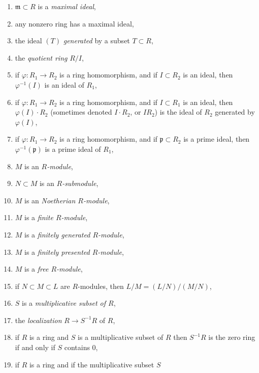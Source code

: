 \begin{enumerate}
\label{prime-ideal}
\item $\mathfrak m \subset R$ is a {\it maximal ideal},
\label{maximal-ideal}
\item any nonzero ring has a maximal ideal,
\label{exists-maximal-ideal}
\item the ideal $(T)$ {\it generated} by a subset $T \subset R$,
\label{ideal-generated-by}
\item the {\it quotient ring} $R/I$,
\label{quotient-ring}
\item if $\varphi : R_1 \to R_2$ is a ring homomorphism, and if
$I \subset R_2$ is an ideal, then $\varphi^{-1}(I)$ is an
ideal of $R_1$,
\label{inverse-image-ideal}
\item if $\varphi : R_1 \to R_2$ is a ring homomorphism, and if
$I \subset R_1$ is an ideal, then $\varphi(I) \cdot R_2$ (sometimes
denoted $I \cdot R_2$, or $IR_2$) is the ideal of $R_2$ generated
by $\varphi(I)$,
\label{image-ideal}
\item if $\varphi : R_1 \to R_2$ is a ring homomorphism, and if
$\mathfrak p \subset R_2$ is a prime ideal, then
$\varphi^{-1}(\mathfrak p)$ is a prime ideal of $R_1$,
\label{inverse-image-prime}
\item $M$ is an {\it $R$-module},
\label{module}
\item $N \subset M$ is an {\it $R$-submodule},
\label{submodule}
\item $M$ is an {\it Noetherian $R$-module},
\label{Noetherian-module}
\item $M$ is a {\it finite $R$-module},
\label{finite-module}
\item $M$ is a {\it finitely generated $R$-module},
\label{finitely-generated-module}
\item $M$ is a {\it finitely presented $R$-module},
\label{finitely-presented-module}
\item $M$ is a {\it free $R$-module},
\label{free-module}
\item if $N \subset M \subset L$ are $R$-modules,
then $L/M = (L/N)/(M/N)$,
\label{isomorphism-theorem}
\item $S$ is a {\it multiplicative subset of $R$},
\label{multiplicative-subset}
\item the {\it localization} $R \to S^{-1}R$ of $R$,
\label{localization-ring}
\item if $R$ is a ring and $S$ is a multiplicative subset
of $R$ then $S^{-1}R$ is the zero ring if and only if $S$ contains
$0$,
\label{localization-zero}
\item if $R$ is a ring and if the multiplicative subset $S$

\end{enumerate}
